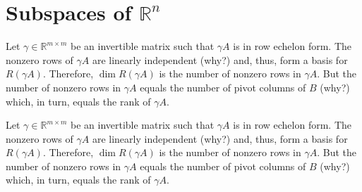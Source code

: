 \documentclass{amsart}
\newcommand{\RR}{\mathbb{R}}
\begin{document}
\section{Subspaces of $\RR^n$}
Let $\gamma\in\RR^{m\times m}$ be an invertible matrix such that $\gamma A$ is in row echelon form.
The nonzero rows of $\gamma A$ are linearly independent (why?) and, thus, form a basis for $R(\gamma A)$.
Therefore, $\dim R(\gamma A)$ is the number of nonzero rows in $\gamma A$.
But the number of nonzero rows in $\gamma A$ equals the number of pivot columns of $B$ (why?) which, in turn, equals the rank of $\gamma A$.

Let $\gamma\in\RR^{m\times m}$ be an invertible matrix such that $\gamma A$ is in row echelon form.
The nonzero rows of $\gamma A$ are linearly independent (why?) and, thus, form a basis for $R(\gamma A)$.
Therefore, $\dim R(\gamma A)$ is the number of nonzero rows in $\gamma A$.
But the number of nonzero rows in $\gamma A$ equals the number of pivot columns of $B$ (why?) which, in turn, equals the rank of $\gamma A$.
\end{document}
